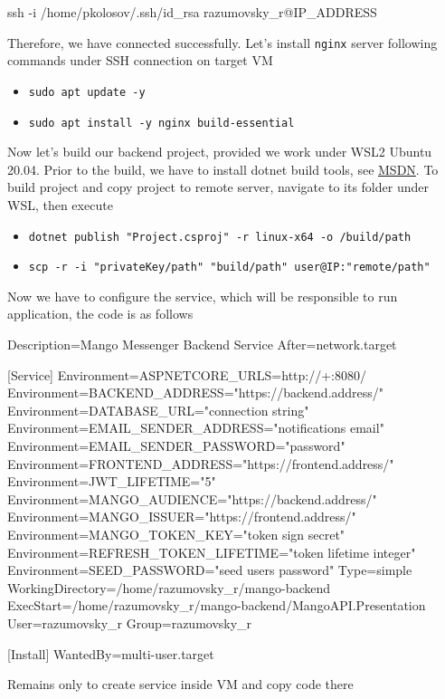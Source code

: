 \begin{spverbatim}
    ssh -i /home/pkolosov/.ssh/id_rsa razumovsky_r@IP_ADDRESS
\end{spverbatim}

Therefore, we have connected successfully.
Let's install \texttt{nginx} server following commands under SSH connection on target VM
\begin{itemize}
    \item \texttt{sudo apt update -y}
    \item \texttt{sudo apt install -y nginx build-essential}
\end{itemize}
Now let's build our backend project, provided we work under WSL2 Ubuntu 20.04.
Prior to the build, we have to install dotnet build tools, see
\href{https://docs.microsoft.com/en-us/dotnet/core/install/linux-ubuntu}{MSDN}.
To build project and copy project to remote server,
navigate to its folder under WSL, then execute

\begin{itemize}
    \item \texttt{dotnet publish "Project.csproj" -r linux-x64 -o /build/path}
    \item \texttt{scp -r -i "privateKey/path" "build/path" user@IP:"remote/path"}
\end{itemize}

Now we have to configure the service, which will be responsible to run application,
the code is as follows

\begin{center}
    \begin{spverbatim}
        [Unit]
        Description=Mango Messenger Backend Service
        After=network.target

        [Service]
        Environment=ASPNETCORE_URLS=http://+:8080/
        Environment=BACKEND_ADDRESS="https://backend.address/"
        Environment=DATABASE_URL="connection string"
        Environment=EMAIL_SENDER_ADDRESS="notifications email"
        Environment=EMAIL_SENDER_PASSWORD="password"
        Environment=FRONTEND_ADDRESS="https://frontend.address/"
        Environment=JWT_LIFETIME="5"
        Environment=MANGO_AUDIENCE="https://backend.address/"
        Environment=MANGO_ISSUER="https://frontend.address/"
        Environment=MANGO_TOKEN_KEY="token sign secret"
        Environment=REFRESH_TOKEN_LIFETIME="token lifetime integer"
        Environment=SEED_PASSWORD="seed users password"
        Type=simple
        WorkingDirectory=/home/razumovsky_r/mango-backend
        ExecStart=/home/razumovsky_r/mango-backend/MangoAPI.Presentation
        User=razumovsky_r
        Group=razumovsky_r

        [Install]
        WantedBy=multi-user.target
    \end{spverbatim}
\end{center}
Remains only to create service inside VM and copy code there


